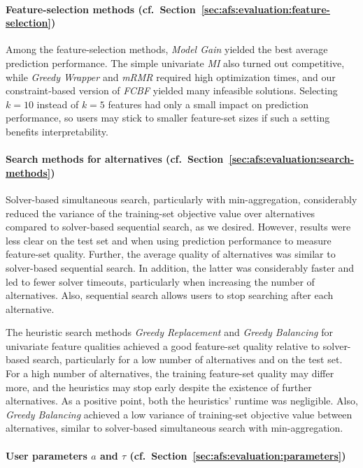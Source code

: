 \documentclass{article}
\theoremstyle{definition}
\begin{document}
\paragraph{Feature-selection methods (cf.~Section~\ref{sec:afs:evaluation:feature-selection})}

Among the feature-selection methods, \emph{Model Gain} yielded the best average prediction performance.
The simple univariate \emph{MI} also turned out competitive, while \emph{Greedy Wrapper} and \emph{mRMR} required high optimization times, and our constraint-based version of \emph{FCBF} yielded many infeasible solutions.
Selecting $k=10$ instead of $k=5$ features had only a small impact on prediction performance, so users may stick to smaller feature-set sizes if such a setting benefits interpretability.

\paragraph{Search methods for alternatives (cf.~Section~\ref{sec:afs:evaluation:search-methods})}

Solver-based simultaneous search, particularly with min-aggregation, considerably reduced the variance of the training-set objective value over alternatives compared to solver-based sequential search, as we desired.
However, results were less clear on the test set and when using prediction performance to measure feature-set quality.
Further, the average quality of alternatives was similar to solver-based sequential search.
In addition, the latter was considerably faster and led to fewer solver timeouts, particularly when increasing the number of alternatives.
Also, sequential search allows users to stop searching after each alternative.

The heuristic search methods \emph{Greedy Replacement} and \emph{Greedy Balancing} for univariate feature qualities achieved a good feature-set quality relative to solver-based search, particularly for a low number of alternatives and on the test set.
For a high number of alternatives, the training feature-set quality may differ more, and the heuristics may stop early despite the existence of further alternatives.
As a positive point, both the heuristics' runtime was negligible.
Also, \emph{Greedy Balancing} achieved a low variance of training-set objective value between alternatives, similar to solver-based simultaneous search with min-aggregation.

\paragraph{User parameters $a$ and $\tau$ (cf.~Section~\ref{sec:afs:evaluation:parameters})}
\end{document}
